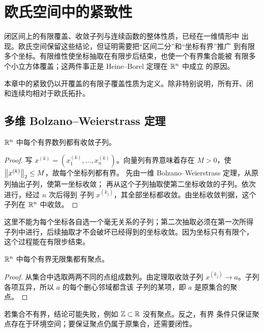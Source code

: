 \chapter{欧氏空间中的紧致性}
\label{chap:euclidean-compactness}

闭区间上的有限覆盖、收敛子列与连续函数的整体性质，已经在一维情形中
出现。欧氏空间保留这些结论，但证明需要把“区间二分”和“坐标有界”推广
到有限多个坐标。有限维性使坐标抽取在有限步后结束，也使一个有界集合能被
有限多个小立方体覆盖；这两件事正是 Heine--Borel 定理在 \(\mathbb{R}^n\) 中成立
的原因。

本章中的紧致仍以开覆盖的有限子覆盖性质为定义。除非特别说明，所有开、闭
和连续均相对于欧氏拓扑。

\section{多维 Bolzano--Weierstrass 定理}

\begin{theorem}
\label{thm:multidimensional-bolzano-weierstrass}
\(\mathbb{R}^n\) 中每个有界数列都有收敛子列。
\end{theorem}

\begin{proof}
写 \(x^{(k)}=(x_1^{(k)},\ldots,x_n^{(k)})\)。向量列有界意味着存在
\(M>0\)，使 \(\left\lVert x^{(k)}\right\rVert_2\le M\)，故每个坐标列都有界。
先由一维 Bolzano--Weierstrass 定理，从原列抽出子列，使第一坐标收敛；
再从这个子列抽取使第二坐标收敛的子列。依次进行，经过 \(n\) 次后得到
子列 \(x^{(k_j)}\)，其全部坐标都收敛。由坐标收敛判据，这个子列在
\(\mathbb{R}^n\) 中收敛。
\end{proof}

这里不能为每个坐标各自选一个毫无关系的子列；第二次抽取必须在第一次所得
子列中进行，后续抽取才不会破坏已经得到的坐标收敛。因为坐标只有有限个，
这个过程能在有限步结束。

\begin{corollary}[有界无限集的聚点]
\label{cor:bounded-infinite-set-accumulation}
\(\mathbb{R}^n\) 中每个有界无限集都有聚点。
\end{corollary}

\begin{proof}
从集合中选取两两不同的点组成数列。由定理取收敛子列
\(x^{(k_j)}\to a\)。子列各项互异，所以 \(a\) 的每个删心邻域都含该
子列的某项，即 \(a\) 是原集合的聚点。
\end{proof}

若集合不有界，结论可能失败，例如 \(\mathbb{Z}\subset\mathbb{R}\) 没有聚点。反之，有界
条件只保证聚点存在于环境空间；要保证聚点仍属于原集合，还需要闭性。

